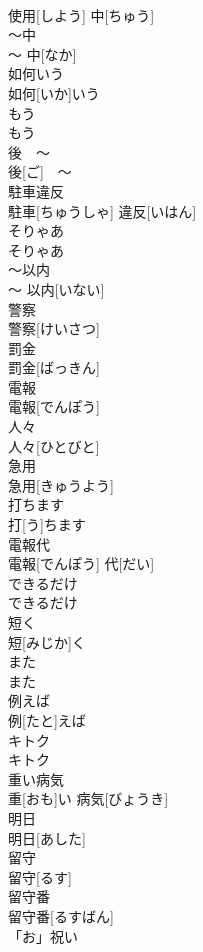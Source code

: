 \documentclass[8pt]{extreport}
\begin{document}
\begin{CJK}{UTF8}{min}
\\	使用[しよう] 中[ちゅう]	
\\	〜中	
\\	〜 中[なか]	
\\	如何いう	
\\	如何[いか]いう	
\\	もう 
\\	もう 
\\	後　〜	
\\	後[ご]　〜	
\\	駐車違反	
\\	駐車[ちゅうしゃ] 違反[いはん]	
\\	そりゃあ	
\\	そりゃあ	
\\	〜以内	
\\	〜 以内[いない]	
\\	警察	
\\	警察[けいさつ]	
\\	罰金	
\\	罰金[ばっきん]	
\\	電報	
\\	電報[でんぽう]	
\\	人々	
\\	人々[ひとびと]	
\\	急用	
\\	急用[きゅうよう]	
\\	打ちます	
\\	打[う]ちます	
\\	電報代	
\\	電報[でんぽう] 代[だい]	
\\	できるだけ	
\\	できるだけ	
\\	短く	
\\	短[みじか]く	
\\	また	
\\	また	
\\	例えば	
\\	例[たと]えば	
\\	キトク	
\\	キトク	
\\	重い病気	
\\	重[おも]い 病気[びょうき]	
\\	明日	
\\	明日[あした]	
\\	留守	
\\	留守[るす]	
\\	留守番	
\\	留守番[るすばん]	
\\	「お」祝い	

\end{CJK}
\end{document}
